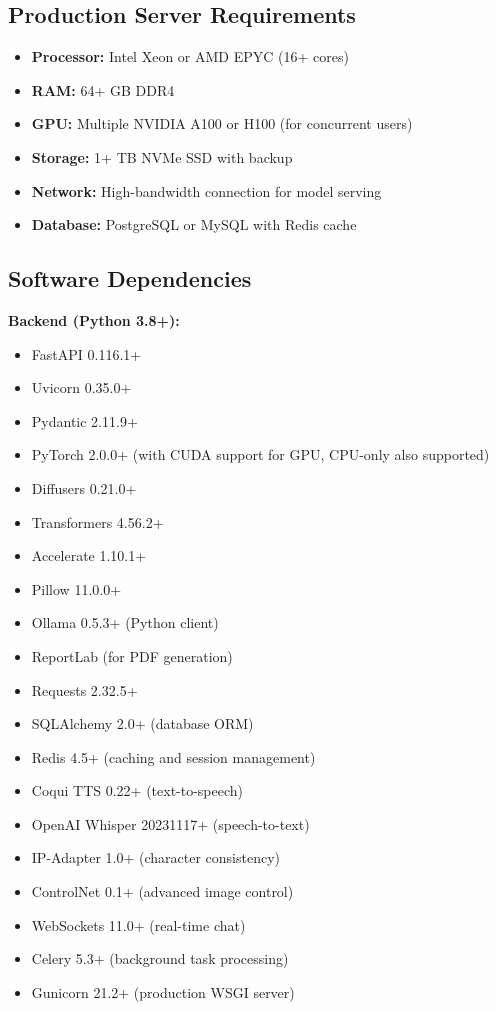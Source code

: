 {\subsection{Production Server Requirements}
\begin{itemize}
    \item \textbf{Processor:} Intel Xeon or AMD EPYC (16+ cores)
    \item \textbf{RAM:} 64+ GB DDR4
    \item \textbf{GPU:} Multiple NVIDIA A100 or H100 (for concurrent users)
    \item \textbf{Storage:} 1+ TB NVMe SSD with backup
    \item \textbf{Network:} High-bandwidth connection for model serving
    \item \textbf{Database:} PostgreSQL or MySQL with Redis cache
\end{itemize}

\subsection{Software Dependencies}

\textbf{Backend (Python 3.8+):}
\begin{itemize}
    \item FastAPI 0.116.1+
    \item Uvicorn 0.35.0+
    \item Pydantic 2.11.9+
    \item PyTorch 2.0.0+ (with CUDA support for GPU, CPU-only also supported)
    \item Diffusers 0.21.0+
    \item Transformers 4.56.2+
    \item Accelerate 1.10.1+
    \item Pillow 11.0.0+
    \item Ollama 0.5.3+ (Python client)
    \item ReportLab (for PDF generation)
    \item Requests 2.32.5+
    \item SQLAlchemy 2.0+ (database ORM)
    \item Redis 4.5+ (caching and session management)
    \item Coqui TTS 0.22+ (text-to-speech)
    \item OpenAI Whisper 20231117+ (speech-to-text)
    \item IP-Adapter 1.0+ (character consistency)
    \item ControlNet 0.1+ (advanced image control)
    \item WebSockets 11.0+ (real-time chat)
    \item Celery 5.3+ (background task processing)
    \item Gunicorn 21.2+ (production WSGI server)
\end{itemize}

}
